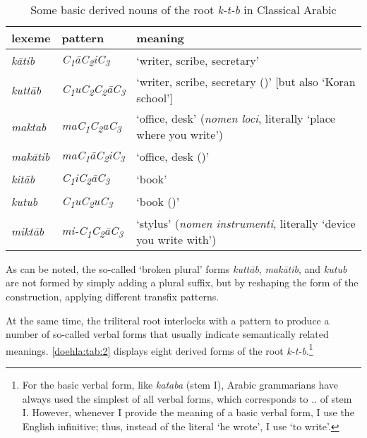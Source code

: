 \documentclass[output=paper]{langscibook}
\begin{document}
\begin{table}
    \begin{tabularx}{\textwidth}{llQ}\midrule\toprule
        lexeme  & pattern    & meaning                                                             \\ \midrule
        \textit{kātib}   & \textit{C\textsubscript{1}āC\textsubscript{2}iC\textsubscript{3}} & ‘writer,   scribe, secretary’                                       \\
        \textit{kuttāb}  & \textit{C\textsubscript{1}uC\textsubscript{2}C\textsubscript{2}āC\textsubscript{3}} & ‘writer,   scribe, secretary (\Pl{})’ [but also \Sg{} ‘Koran school’] \\
        \textit{maktab}  & \textit{maC\textsubscript{1}C\textsubscript{2}aC\textsubscript{3}} & ‘office,   desk’ (\textit{nomen loci}, literally ‘place where you write’)    \\
        \textit{makātib} & \textit{maC\textsubscript{1}āC\textsubscript{2}iC\textsubscript{3}} & ‘office,   desk (\Pl{})’                                               \\
        \textit{kitāb}   & \textit{C\textsubscript{1}iC\textsubscript{2}āC\textsubscript{3}} & ‘book’                                                              \\
        \textit{kutub}   & \textit{C\textsubscript{1}uC\textsubscript{2}uC\textsubscript{3}} & ‘book (\Pl{})’ \\
        \textit{miktāb}  & \textit{mi-C\textsubscript{1}C\textsubscript{2}āC\textsubscript{3}} & ‘stylus’   (\textit{nomen instrumenti}, literally ‘device you write with’)\\ \bottomrule\midrule
    \end{tabularx}
    \caption{Some basic derived nouns of the root \textit{k-t-b} in Classical Arabic}
    \label{doehla:tab:1}
\end{table}

As can be noted, the so-called ‘broken plural’ forms \textit{kuttāb}, \textit{makātib}, and \textit{kutub} are not formed by simply adding a plural suffix, but by reshaping the form of the construction, applying different transfix patterns. 

At the same time, the triliteral root interlocks with a pattern to produce a number of so-called verbal forms that usually indicate semantically related meanings. \autoref{doehla:tab:2} displays eight derived forms of the root \textit{k-t-b}.\footnote{For the basic verbal form, like \textit{kataba} (stem I), Arabic grammarians have always used the simplest of all verbal forms, which corresponds to \Third\SG.\M.\PFV{} of stem I. However, whenever I provide the meaning of a basic verbal form, I use the English infinitive; thus, instead of the literal ‘he wrote’, I use ‘to write’.}
\end{document}
